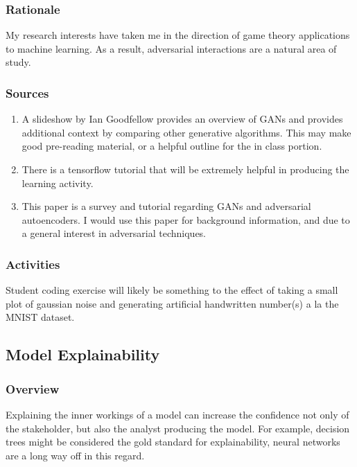 \documentclass[12pt]{amsart}
\begin{document}
\subsubsection{Rationale}
My research interests have taken me in the direction of game theory applications to machine learning.
As a result, adversarial interactions are a natural area of study.

\subsubsection{Sources}
\begin{enumerate}
	\item A slideshow by Ian Goodfellow \cite{Goodfellow_2016} provides an overview of GANs and provides
	additional context by comparing other generative algorithms. 
	This may make good pre-reading material, or a helpful outline for the in class portion.
	\item There is a tensorflow \cite{tf-GAN} tutorial that will be extremely helpful in producing the 
	learning activity.
	\item This \cite{Ghojogh_Ghodsi_Karray_Crowley_2021} paper is a survey and tutorial regarding GANs and adversarial autoencoders.
	I would use this paper for background information, and due to a general interest in adversarial techniques.
\end{enumerate}

\subsubsection{Activities}
Student coding exercise will likely be something to the effect of taking a small plot of gaussian noise
and generating artificial handwritten number(s) a la the MNIST dataset.



\subsection{Model Explainability}
\subsubsection{Overview}
Explaining the inner workings of a model can increase the confidence not only of the stakeholder,
but also the analyst producing the model. For example, decision trees might be considered the gold standard
for explainability, neural networks are a long way off in this regard.
\end{document}
